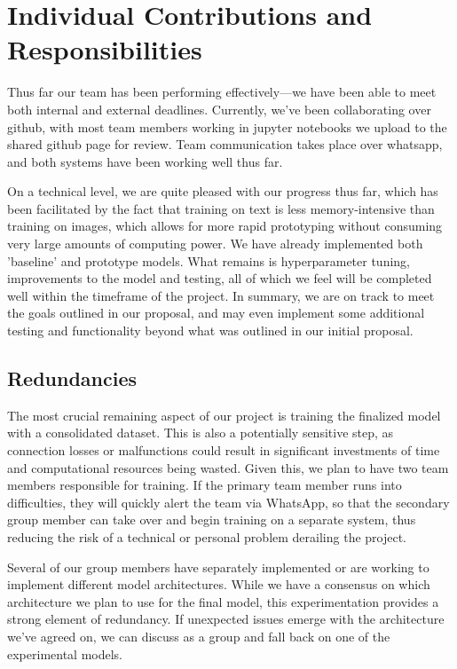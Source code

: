 \documentclass{article} %
\begin{document}
\section{Individual Contributions and Responsibilities}

Thus far our team has been performing effectively—we have been able to meet both internal and external deadlines. Currently, we've been collaborating over github, with most team members working in jupyter notebooks we upload to the shared github page for review. Team communication takes place over whatsapp, and both systems have been working well thus far.

On a technical level, we are quite pleased with our progress thus far, which has been facilitated by the fact that training on text is less memory-intensive than training on images, which allows for more rapid prototyping without consuming very large amounts of computing power. We have already implemented both 'baseline' and prototype models. What remains is hyperparameter tuning, improvements to the model and testing, all of which we feel will be completed well within the timeframe of the project. In summary, we are on track to meet the goals outlined in our proposal, and may even implement some additional testing and functionality beyond what was outlined in our initial proposal.


\subsection{Redundancies}

The most crucial remaining aspect of our project is training the finalized model with a consolidated dataset. This is also a potentially sensitive step, as connection losses or malfunctions could result in significant investments of time and computational resources being wasted. Given this, we plan to have two team members responsible for training. If the primary team member runs into difficulties, they will quickly alert the team via WhatsApp, so that the secondary group member can take over and begin training on a separate system, thus reducing the risk of a technical or personal problem derailing the project.

Several of our group members have separately implemented or are working to implement different model architectures. While we have a consensus on which architecture we plan to use for the final model, this experimentation provides a strong element of redundancy. If unexpected issues emerge with the architecture we've agreed on, we can discuss as a group and fall back on one of the experimental models.
\end{document}
